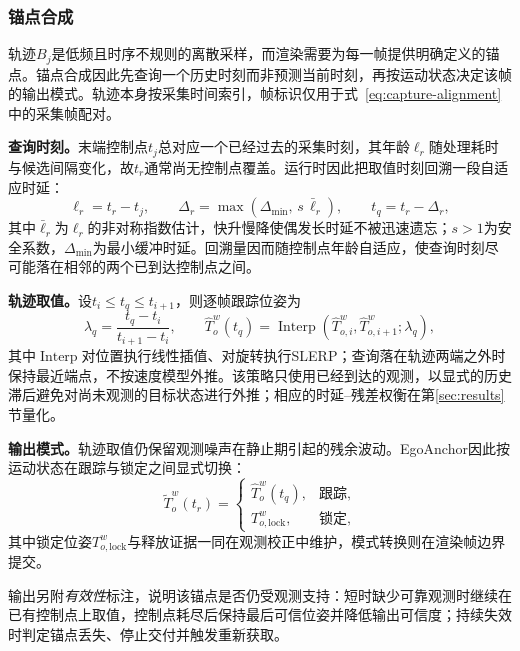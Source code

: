 \documentclass[review]{vgtc}
\begin{document}
\subsubsection{锚点合成}\label{sec:frame-output}

轨迹$B_j$是低频且时序不规则的离散采样，而渲染需要为每一帧提供明确定义的锚点。锚点合成因此先查询一个历史时刻而非预测当前时刻，再按运动状态决定该帧的输出模式。轨迹本身按采集时间索引，帧标识仅用于式~\eqref{eq:capture-alignment}中的采集帧配对。

\textbf{查询时刻。}末端控制点$t_j$总对应一个已经过去的采集时刻，其年龄$\ell_r$随处理耗时与候选间隔变化，故$t_r$通常尚无控制点覆盖。运行时因此把取值时刻回溯一段自适应时延：
\begin{equation}
\ell_r = t_r - t_j, \qquad \Delta_r = \max(\Delta_{\min},\, s\,\bar{\ell}_r), \qquad t_q = t_r - \Delta_r,
\label{eq:target-time}
\end{equation}
其中$\bar{\ell}_r$为$\ell_r$的非对称指数估计，快升慢降使偶发长时延不被迅速遗忘；$s>1$为安全系数，$\Delta_{\min}$为最小缓冲时延。回溯量因而随控制点年龄自适应，使查询时刻尽可能落在相邻的两个已到达控制点之间。

\textbf{轨迹取值。}设$t_i \leq t_q \leq t_{i+1}$，则逐帧跟踪位姿为
\begin{equation}
\lambda_q = \frac{t_q - t_i}{t_{i+1} - t_i}, \qquad \widehat{T}_o^w(t_q) = \operatorname{Interp}(\widehat{T}_{o,i}^{w}, \widehat{T}_{o,i+1}^{w}; \lambda_q),
\label{eq:delayed-interp}
\end{equation}
其中$\operatorname{Interp}$对位置执行线性插值、对旋转执行SLERP；查询落在轨迹两端之外时保持最近端点，不按速度模型外推。该策略只使用已经到达的观测，以显式的历史滞后避免对尚未观测的目标状态进行外推；相应的时延--残差权衡在第\ref{sec:results}节量化。

\textbf{输出模式。}轨迹取值仍保留观测噪声在静止期引起的残余波动。EgoAnchor因此按运动状态在跟踪与锁定之间显式切换：
\begin{equation}
\widetilde{T}_o^w(t_r) = \begin{cases}
\widehat{T}_o^w(t_q), & \text{跟踪}, \\
T_{o,\mathrm{lock}}^w, & \text{锁定},
\end{cases}
\label{eq:staticlock}
\end{equation}
其中锁定位姿$T_{o,\mathrm{lock}}^w$与释放证据一同在观测校正中维护，模式转换则在渲染帧边界提交。

输出另附\emph{有效性}标注，说明该锚点是否仍受观测支持：短时缺少可靠观测时继续在已有控制点上取值，控制点耗尽后保持最后可信位姿并降低输出可信度；持续失效时判定锚点丢失、停止交付并触发重新获取。
\end{document}
